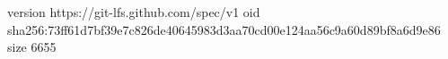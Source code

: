 version https://git-lfs.github.com/spec/v1
oid sha256:73ff61d7bf39e7c826de40645983d3aa70cd00e124aa56c9a60d89bf8a6d9e86
size 6655
